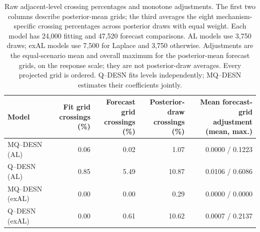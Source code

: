 \begin{table}[!htbp]
\centering
\footnotesize
\setlength{\tabcolsep}{3pt}
\renewcommand{\arraystretch}{1.08}
\begin{tabular}{@{}lrrrr@{}}
\toprule
Model & \shortstack{Fit grid\\crossings (\%)} & \shortstack{Forecast grid\\crossings (\%)} & \shortstack{Posterior-draw\\crossings (\%)} & \shortstack{Mean forecast-grid\\adjustment (mean, max.)} \\
\midrule
MQ--DESN (AL) & 0.06 & 0.02 & 1.07 & 0.0000 / 0.1223 \\
Q--DESN (AL) & 0.85 & 5.49 & 10.87 & 0.0106 / 0.6086 \\
MQ--DESN (exAL) & 0.00 & 0.00 & 0.29 & 0.0000 / 0.0000 \\
Q--DESN (exAL) & 0.00 & 0.61 & 10.62 & 0.0007 / 0.2137 \\
\bottomrule
\end{tabular}
\caption{Raw adjacent-level crossing percentages and monotone adjustments. The first two columns describe posterior-mean grids; the third averages the eight mechanism-specific crossing percentages across posterior draws with equal weight. Each model has 24,000 fitting and 47,520 forecast comparisons. AL models use 3,750 draws; exAL models use 7,500 for Laplace and 3,750 otherwise. Adjustments are the equal-scenario mean and overall maximum for the posterior-mean forecast grids, on the response scale; they are not posterior-draw averages. Every projected grid is ordered. Q--DESN fits levels independently; MQ--DESN estimates their coefficients jointly.}
\label{tab:joint-qdesn-pure-desn-v2-crossings}
\end{table}
